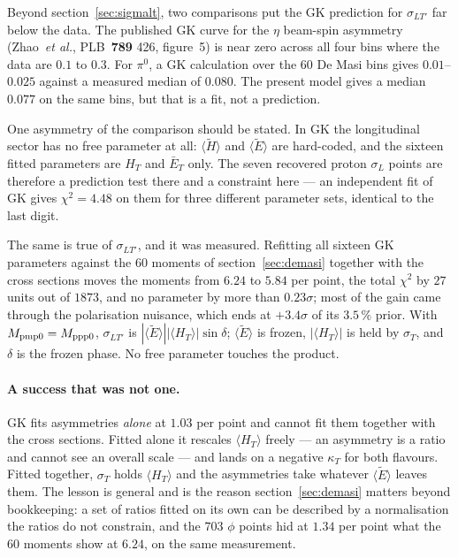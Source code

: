 \documentclass[11pt,a4paper]{article}
\newcommand{\sig}[1]{\sigma_{#1}}
\begin{document}
Beyond section~\ref{sec:sigmalt}, two comparisons put the GK prediction for
$\sig{LT'}$ far below the data.  The published GK curve for the $\eta$
beam-spin asymmetry (Zhao~\textit{et al.}, PLB~\textbf{789} 426, figure~5) is
near zero across all four bins where the data are $0.1$ to $0.3$.  For $\pi^0$,
a GK calculation over the 60 De Masi bins gives $0.01$--$0.025$ against a
measured median of $0.080$.  The present model gives a median $0.077$ on the
same bins, but that is a fit, not a prediction.

One asymmetry of the comparison should be stated.  In GK the longitudinal
sector has no free parameter at all: $\langle\tilde H\rangle$ and
$\langle\tilde E\rangle$ are hard-coded, and the sixteen fitted parameters are
$H_T$ and $\bar E_T$ only.  The seven recovered proton $\sig{L}$ points are
therefore a prediction test there and a constraint here --- an independent fit
of GK gives $\chi^2 = 4.48$ on them for three different parameter sets,
identical to the last digit.

The same is true of $\sig{LT'}$, and it was measured.  Refitting all sixteen GK
parameters against the 60 moments of section~\ref{sec:demasi} together with the
cross sections moves the moments from $6.24$ to $5.84$ per point, the total
$\chi^2$ by $27$ units out of $1873$, and no parameter by more than
$0.23\sigma$; most of the gain came through the polarisation nuisance, which
ends at $+3.4\sigma$ of its $3.5\,\%$ prior.  With $M_{\rm pmp0} = M_{\rm ppp0}$,
$\sig{LT'}$ is $|\langle\tilde E\rangle||\langle H_T\rangle|\sin\delta$;
$\langle\tilde E\rangle$ is frozen, $|\langle H_T\rangle|$ is held by $\sig{T}$,
and $\delta$ is the frozen phase.  No free parameter touches the product.

\paragraph{A success that was not one.}  GK fits asymmetries \emph{alone} at
$1.03$ per point and cannot fit them together with the cross sections.  Fitted
alone it rescales $\langle H_T\rangle$ freely --- an asymmetry is a ratio and
cannot see an overall scale --- and lands on a negative $\kappa_T$ for both
flavours.  Fitted together, $\sig{T}$ holds $\langle H_T\rangle$ and the
asymmetries take whatever $\langle\tilde E\rangle$ leaves them.  The lesson is
general and is the reason section~\ref{sec:demasi} matters beyond bookkeeping:
a set of ratios fitted on its own can be described by a normalisation the ratios
do not constrain, and the $703$ $\phi$ points hid at $1.34$ per point what the
$60$ moments show at $6.24$, on the same measurement.
\end{document}
